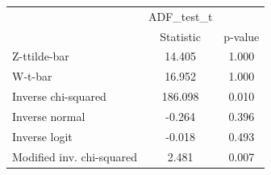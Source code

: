 \begin{tabular}{l*{2}{c}}
\hline\hline
            &  ADF\_test\_t&            \\
            &   Statistic&     p-value\\
\hline
Z-ttilde-bar&      14.405&       1.000\\
W-t-bar     &      16.952&       1.000\\
Inverse chi-squared&     186.098&       0.010\\
Inverse normal&      -0.264&       0.396\\
Inverse logit&      -0.018&       0.493\\
Modified inv. chi-squared&       2.481&       0.007\\
\hline\hline
\end{tabular}
